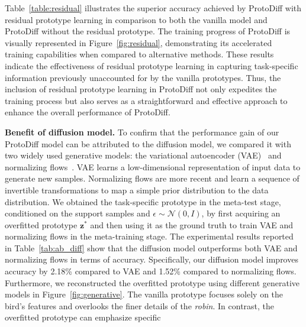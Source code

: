 Table~\ref{table:residual} illustrates the superior accuracy achieved by ProtoDiff with residual prototype learning in comparison to both the vanilla model and ProtoDiff without the residual prototype. The training progress of ProtoDiff is visually represented in Figure~\ref{fig:residual}, demonstrating its accelerated training capabilities when compared to alternative methods. These results indicate the effectiveness of residual prototype learning in capturing task-specific information previously unaccounted for by the vanilla prototypes. Thus, the inclusion of residual prototype learning in ProtoDiff not only expedites the training process but also serves as a straightforward and effective approach to enhance the overall performance of ProtoDiff.


\textbf{Benefit of diffusion model.}
To confirm that the performance gain of our ProtoDiff model can be attributed to the diffusion model, we compared it with two widely used generative models: the variational autoencoder (VAE)~\cite{kingma2013auto} and normalizing flows~\cite{rezende2015variational}. VAE learns a low-dimensional representation of input data to generate new samples. Normalizing flows are more recent and learn a sequence of invertible transformations to map a simple prior distribution to the data distribution.
We obtained the task-specific prototype in the meta-test stage, conditioned on the support samples and $\epsilon \sim \mathcal{N}(0, I)$, by first acquiring an overfitted prototype $\mathbf{z}^*$ and then using it as the ground truth to train VAE and normalizing flows in the meta-training stage. The experimental results reported in Table~\ref{tab:ab_diff} show that the diffusion model outperforms both VAE and normalizing flows in terms of accuracy. Specifically, our diffusion model improves accuracy by 2.18\% compared to VAE and 1.52\% compared to normalizing flows.
Furthermore, we reconstructed the overfitted prototype using different generative models in Figure~\ref{fig:generative}. The vanilla prototype focuses solely on the bird's features and 
overlooks the finer details of the \textit{robin}. In contrast, the overfitted prototype can emphasize specific 
